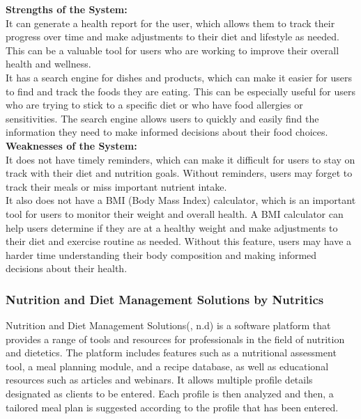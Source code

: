 \documentclass {article}
\begin{document}
\noindent \textbf{Strengths of the System:\\}
\noindent It can generate a health report for the user, which allows them to track their progress over time and make adjustments to their diet and lifestyle as needed. This can be a valuable tool for users who are working to improve their overall health and wellness.\\

\noindent It has a search engine for dishes and products, which can make it easier for users to find and track the foods they are eating. This can be especially useful for users who are trying to stick to a specific diet or who have food allergies or sensitivities. The search engine allows users to quickly and easily find the information they need to make informed decisions about their food choices.\\

\noindent \textbf{Weaknesses of the System: \\}
\noindent It does not have timely reminders, which can make it difficult for users to stay on track with their diet and nutrition goals. Without reminders, users may forget to track their meals or miss important nutrient intake.\\

\noindent It also does not have a BMI (Body Mass Index) calculator, which is an important tool for users to monitor their weight and overall health. A BMI calculator can help users determine if they are at a healthy weight and make adjustments to their diet and exercise routine as needed. Without this feature, users may have a harder time understanding their body composition and making informed decisions about their health.\\

\subsubsection{Nutrition and Diet Management Solutions by Nutritics}

\noindent Nutrition and Diet Management Solutions(, n.d) is a software platform that provides a range of tools and resources for professionals in the field of nutrition and dietetics. The platform includes features such as a nutritional assessment tool, a meal planning module, and a recipe database, as well as educational resources such as articles and webinars. It allows multiple profile details designated as clients to be entered. Each profile is then analyzed and then, a tailored meal plan is suggested according to the profile that has been entered.\\
\end{document}
